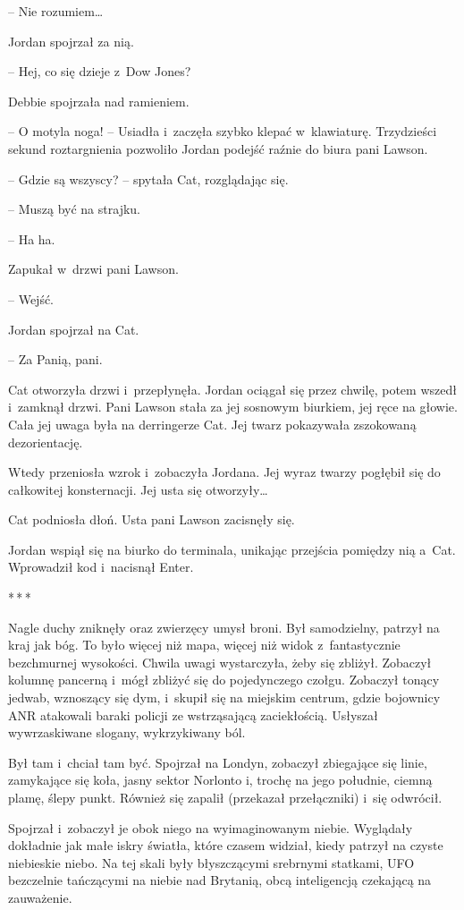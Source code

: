 \documentclass[oneside,polish,11pt,sfheadings]{mwbk}
\newcommand{\threeast}{\bigskip\par\centerline{*\,*\,*}\medskip\par}%
\begin{document}
-- Nie rozumiem\ldots

Jordan spojrzał za nią. 

-- Hej, co się dzieje z~Dow Jones?

Debbie spojrzała nad ramieniem. 

-- O motyla noga! -- Usiadła i~zaczęła
szybko klepać w~klawiaturę. Trzydzieści sekund roztargnienia pozwoliło
Jordan podejść raźnie do biura pani Lawson.

-- Gdzie są wszyscy? -- spytała Cat, rozglądając się.

-- Muszą być na strajku.

-- Ha ha.

Zapukał w~drzwi pani Lawson.

-- Wejść.

Jordan spojrzał na Cat. 

-- Za Panią, pani.

Cat otworzyła drzwi i~przepłynęła. Jordan ociągał się przez chwilę,
potem wszedł i~zamknął drzwi. Pani Lawson stała za jej sosnowym
biurkiem, jej ręce na głowie. Cała jej uwaga była na derringerze Cat.
Jej twarz pokazywała zszokowaną dezorientację.

Wtedy przeniosła wzrok i~zobaczyła Jordana. Jej wyraz twarzy pogłębił
się do całkowitej konsternacji. Jej usta się otworzyły\ldots

Cat podniosła dłoń. Usta pani Lawson zacisnęły się.

Jordan wspiął się na biurko do terminala, unikając przejścia pomiędzy
nią a~Cat. Wprowadził kod i~nacisnął Enter.
  \threeast 

Nagle duchy zniknęły oraz zwierzęcy umysł broni. Był samodzielny,
patrzył na kraj jak bóg. To było więcej niż mapa, więcej niż widok z~fantastycznie bezchmurnej wysokości. Chwila uwagi wystarczyła, żeby się
zbliżył. Zobaczył kolumnę pancerną i~mógł zbliżyć się do pojedynczego
czołgu. Zobaczył tonący jedwab, wznoszący się dym, i~skupił się na
miejskim centrum, gdzie bojownicy ANR atakowali baraki policji ze
wstrząsającą zaciekłością. Usłyszał wywrzaskiwane slogany, wykrzykiwany
ból.

Był tam i~chciał tam być. Spojrzał na Londyn, zobaczył zbiegające się
linie, zamykające się koła, jasny sektor Norlonto i, trochę na jego
południe, ciemną plamę, ślepy punkt. Również się zapalił (przekazał
przełączniki) i~się odwrócił.

Spojrzał i~zobaczył je obok niego na wyimaginowanym niebie. Wyglądały
dokładnie jak małe iskry światła, które czasem widział, kiedy patrzył na
czyste niebieskie niebo. Na tej skali były błyszczącymi srebrnymi
statkami, UFO bezczelnie tańczącymi na niebie nad Brytanią, obcą
inteligencją czekającą na zauważenie.
\end{document}
